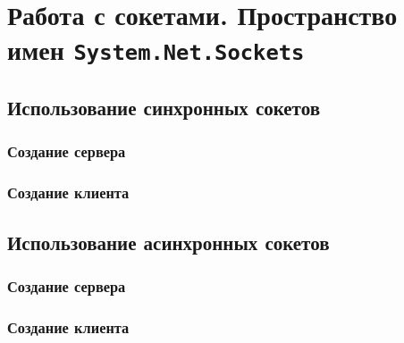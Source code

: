 \newpage
\section{Работа с сокетами. Пространство имен \texttt{System.Net.Sockets}}
\subsection{Использование синхронных сокетов}
    \subsubsection{Создание сервера}
    \subsubsection{Создание клиента}
\subsection{Использование асинхронных сокетов}
    \subsubsection{Создание сервера}
    \subsubsection{Создание клиента}